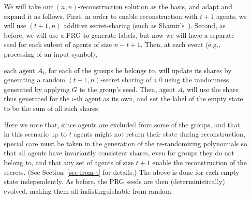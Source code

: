\documentclass[letterpaper,11pt]{article}
\newcommand{\ignore}[1]{}
               {}
\begin{document}
We will take our $(n, n)$-reconstruction solution as the basis, and
adapt and expand it as follows.  First, in order to enable
reconstruction with $t+1$ agents, we will use $(t+1,n)$ additive
secret-sharing (such as Shamir's~\cite{Sha79}).  Second, as before,
we will use a PRG to generate labels, but now we will have a
separate seed for each subset of agents of size $n-t+1$.  Then, at each
event (e.g., processing of an input symbol),
\ignore{
 $\gamma$
\textcolor{blue}{\todo{Lena: clock cycle with or without input letter}
VLAD: We need to agree on the detail how we schedule inputs. I think
it should be at most one input per clock cycle, right.  We should
write and justify it in the model section above.},
}
each agent $A_i$,
for each of the groups he belongs to, will update its shares by
generating a random $(t+1,n)$-secret sharing of a $0$ using the randomness generated by applying $G$
to the group's seed.  Then, agent $A_i$ will use the share thus generated for
the $i$-th agent as its own,
and set the label of the empty state to be the sum of all such shares.

Here we note that, since agents are excluded from some of the groups,
and that in this scenario up to $t$ agents might not return their
state during reconstruction, special care must be taken in the
generation of the re-randomizing polynomials so that all agents have
invariantly consistent shares, even for groups they do not belong to,
and that any set of agents of size $t+1$ enable the reconstruction of
the secrets.  (See Section~\ref{sec-from-t} for details.)
The above is done for each empty state independently.
As before, the PRG seeds are then (deterministically) evolved,
making them all indistinguishable from random.

\ignore{

{\bf $(t+1, n)$-reconstruction using additively homomorphic encryption.}  In our third scenario, we will make use of additively homomorphic public-key encryption, such as Goldwasser-Micali~\cite{C:GolMic88} (for $(n,n)$ reconstruction) or Paillier~\cite{EC:Paillier98}.

Our main idea here is to encrypt the state labels with the public key known to the dealer (or reconstructible by a threshold of players).  The output is then obtained by running a secure multiparty computation on the player's current states.   Now, during FSA computation, since the labels are encrypted, they hide the state update history, and empty states can be simply labeled with encryptions of $0$ (for $(n,n)$ reconstruction) and with Shamir shares of $0$ derived from a single seed.

} 
\end{document}
